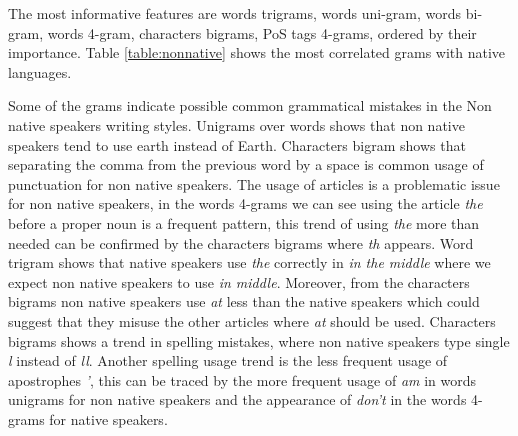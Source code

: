 \documentclass[10pt,a5paper,twoside]{article}
\begin{document}
The most informative features are words trigrams, words uni-gram, words bi-gram, words 4-gram, characters bigrams, PoS tags 4-grams, ordered by their importance. Table \ref{table:nonnative} shows the most correlated grams with native languages.

Some of the grams indicate possible common grammatical mistakes in the Non native speakers writing styles. Unigrams over words shows that non native speakers tend to use earth instead of Earth. Characters bigram shows that separating the comma from the previous word by a space is common usage of punctuation for non native speakers.
The usage of articles is a problematic issue for non native speakers, in the words 4-grams we can see using the article \emph{the} before a proper noun is a frequent pattern, this trend of using \emph{the} more than needed can be confirmed by the characters bigrams where \emph{th} appears. Word trigram shows that native speakers use \emph{the} correctly in \emph{in the middle} where we expect non native speakers to use \emph{in middle}.
Moreover, from the characters bigrams non native speakers use \emph{at} less than the native speakers which could suggest that they misuse the other articles where \emph{at} should be used. Characters bigrams shows a trend in spelling mistakes, where non native speakers type single \emph{l} instead of \emph{ll}. Another spelling usage trend is the less frequent usage of apostrophes \emph{'}, this can be traced by the more frequent usage of \emph{am} in words unigrams for non native speakers and the appearance of \emph{don't} in the words 4-grams for native speakers.
\end{document}
